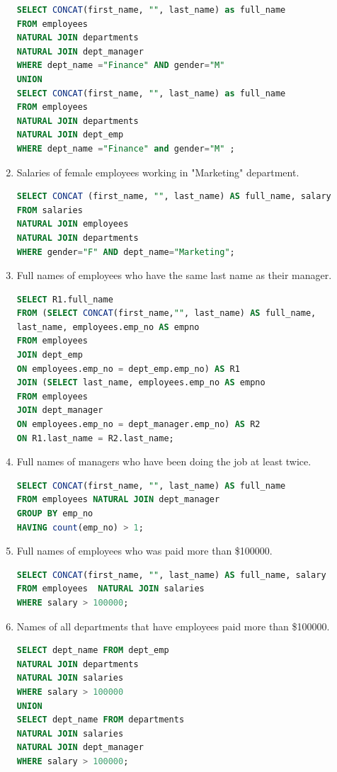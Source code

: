 \documentclass{article}
\begin{document}
\begin{enumerate}
	\begin{lstlisting}[language=SQL]	
SELECT CONCAT(first_name, "", last_name) as full_name
FROM employees
NATURAL JOIN departments
NATURAL JOIN dept_manager
WHERE dept_name ="Finance" AND gender="M" 
UNION 
SELECT CONCAT(first_name, "", last_name) as full_name 
FROM employees
NATURAL JOIN departments 
NATURAL JOIN dept_emp
WHERE dept_name ="Finance" and gender="M" ;
	\end{lstlisting}
	
	
	\item Salaries of female employees working in "Marketing" department.\\
	
	\begin{lstlisting}[language=SQL]	
SELECT CONCAT (first_name, "", last_name) AS full_name, salary 
FROM salaries 
NATURAL JOIN employees
NATURAL JOIN departments
WHERE gender="F" AND dept_name="Marketing";
	\end{lstlisting}
	
	\item Full names of employees who have the same last name as their manager.\\
	
	\begin{lstlisting}[language=SQL]	
SELECT R1.full_name
FROM (SELECT CONCAT(first_name,"", last_name) AS full_name,
last_name, employees.emp_no AS empno 
FROM employees
JOIN dept_emp
ON employees.emp_no = dept_emp.emp_no) AS R1
JOIN (SELECT last_name, employees.emp_no AS empno 
FROM employees
JOIN dept_manager 
ON employees.emp_no = dept_manager.emp_no) AS R2
ON R1.last_name = R2.last_name;	
	\end{lstlisting}
	
	\item Full names of managers who have been doing the job at least twice.\\
	
	\begin{lstlisting}[language=SQL]	
SELECT CONCAT(first_name, "", last_name) AS full_name
FROM employees NATURAL JOIN dept_manager
GROUP BY emp_no 
HAVING count(emp_no) > 1;
	\end{lstlisting}
	
	\item Full names of employees who was paid more than \$100000.
	
	\begin{lstlisting}[language=SQL]
SELECT CONCAT(first_name, "", last_name) AS full_name, salary 
FROM employees	NATURAL JOIN salaries
WHERE salary > 100000;
	\end{lstlisting}
	
	\item Names of all departments that have employees paid more than \$100000.\\
	
	\begin{lstlisting}[language=SQL]
SELECT dept_name FROM dept_emp
NATURAL JOIN departments 
NATURAL JOIN salaries
WHERE salary > 100000
UNION
SELECT dept_name FROM departments 
NATURAL JOIN salaries 
NATURAL JOIN dept_manager
WHERE salary > 100000;
	\end{lstlisting}
\end{enumerate}
\end{document}
